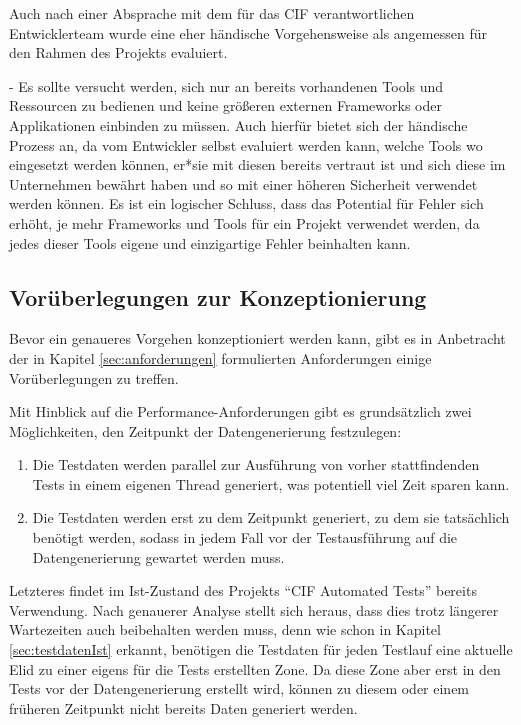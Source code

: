 Auch nach einer Absprache mit dem für das \ac*{CIF} verantwortlichen Entwicklerteam wurde eine eher händische Vorgehensweise als angemessen für den Rahmen des Projekts evaluiert.

- Es sollte versucht werden, sich nur an bereits vorhandenen Tools und Ressourcen zu bedienen und keine größeren externen Frameworks oder Applikationen einbinden zu müssen. Auch hierfür bietet sich der händische Prozess an, da vom Entwickler selbst evaluiert werden kann, welche Tools wo eingesetzt werden können, er*sie mit diesen bereits vertraut ist und sich diese im Unternehmen bewährt haben und so mit einer höheren Sicherheit verwendet werden können. Es ist ein logischer Schluss, dass das Potential für Fehler sich erhöht, je mehr Frameworks und Tools für ein Projekt verwendet werden, da jedes dieser Tools eigene und einzigartige Fehler beinhalten kann.

\subsection{Vorüberlegungen zur Konzeptionierung}\label{subsec:vorueberlegungen}
Bevor ein genaueres Vorgehen konzeptioniert werden kann, gibt es in Anbetracht der in Kapitel \ref{sec:anforderungen} formulierten Anforderungen einige Vorüberlegungen zu treffen.

Mit Hinblick auf die Performance-Anforderungen gibt es grundsätzlich zwei Möglichkeiten, den Zeitpunkt der Datengenerierung festzulegen:

\begin{enumerate}
    \item Die Testdaten werden parallel zur Ausführung von vorher stattfindenden Tests in einem eigenen Thread generiert, was potentiell viel Zeit sparen kann.
    \item Die Testdaten werden erst zu dem Zeitpunkt generiert, zu dem sie tatsächlich benötigt werden, sodass in jedem Fall vor der Testausführung auf die Datengenerierung gewartet werden muss.
\end{enumerate}

Letzteres findet im Ist-Zustand des Projekts \enquote{CIF Automated Tests} bereits Verwendung. Nach genauerer Analyse stellt sich heraus, dass dies trotz längerer Wartezeiten auch beibehalten werden muss, denn wie schon in Kapitel \ref{sec:testdatenIst} erkannt, benötigen die Testdaten für jeden Testlauf eine aktuelle \ac{Elid} zu einer eigens für die Tests erstellten Zone. Da diese Zone aber erst in den Tests vor der Datengenerierung erstellt wird, können zu diesem oder einem früheren Zeitpunkt nicht bereits Daten generiert werden.

